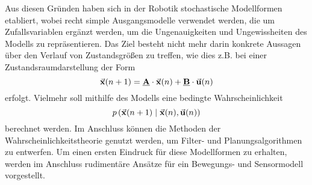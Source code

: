 Aus diesen Gründen haben sich in der Robotik stochastische Modellformen etabliert, wobei recht simple Ausgangsmodelle verwendet werden, die um Zufallsvariablen ergänzt werden, um die Ungenauigkeiten und Ungewissheiten des Modells zu repräsentieren. Das Ziel besteht nicht mehr darin konkrete Aussagen über den Verlauf von Zustandsgrößen zu treffen, wie dies z.B. bei einer Zustandsraumdarstellung der Form
\begin{equation}
\vec{\mathbf{x}}(n+1) = \mathbf{\underline{{{A}}}}\cdot \vec{\mathbf{x}}(n) + \mathbf{\underline{{B}}}\cdot \vec{\mathbf{\mathbf{u}}}(n)
\end{equation}
erfolgt. Vielmehr soll mithilfe des Modells eine bedingte Wahrscheinlichkeit
\begin{equation}
p\left({\vec{\mathbf{x}}(n+1)} \hspace{1mm} \vert \hspace{1mm} {\vec{\mathbf{x}}(n), \vec{\mathbf{u}}(n)}\right)
\end{equation}
berechnet werden. Im Anschluss können die Methoden der Wahrscheinlichkeitstheorie genutzt werden, um Filter- und Planungsalgorithmen zu entwerfen. Um einen ersten Eindruck für diese Modellformen zu erhalten, werden im Anschluss rudimentäre Ansätze für ein Bewegungs- und Sensormodell vorgestellt.


\newpage

\newpage

